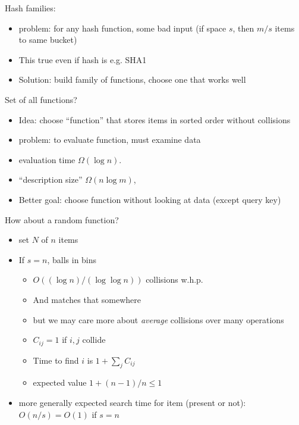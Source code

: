 \documentclass[12pt]{article}
\begin{document}
Hash families:
\begin{itemize}
\item problem: for any hash function, some bad input (if space $s$,
  then $m/s$ items to same bucket)
\item This true even if hash is e.g. SHA1
\item Solution: build family of functions, choose one that works well
\end{itemize}


Set of all functions?
\begin{itemize}
\item Idea: choose ``function'' that stores items in sorted order
  without collisions
\item problem: to evaluate function, must examine data
\item evaluation time $\Omega(\log n)$.
\item ``description size'' $\Omega(n \log m)$,
\item Better goal: choose function without looking at data (except query key)
\end{itemize}

How about a random function?
\begin{itemize}
\item set $N$ of $n$ items
\item If $s=n$,  balls in bins
\begin{itemize}
\item $O((\log n)/(\log\log n))$  collisions w.h.p.
\item And matches that somewhere
\item but we may care more about \emph{average} collisions over many operations
\item $C_{ij}=1$ if $i,j$ collide
\item Time to find $i$ is $1+\sum_j C_{ij}$
\item expected value $1+(n-1)/n \le 1$
\end{itemize}
\item more generally expected search time for item (present or not):
  $O(n/s)=O(1)$ if $s=n$
\end{itemize}
\end{document}
